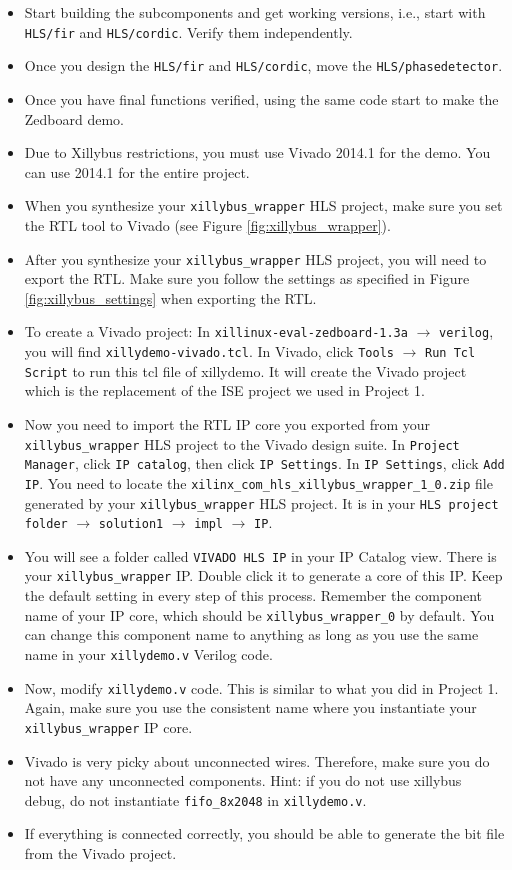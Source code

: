 \begin{itemize}
\item Start building the subcomponents and get working versions, i.e., start with \texttt{HLS/fir} and \texttt{HLS/cordic}. Verify them independently.
\item Once you design the \texttt{HLS/fir} and \texttt{HLS/cordic}, move the \texttt{HLS/phasedetector}. 
\item Once you have final functions verified, using the same code start to make the Zedboard demo.
\item Due to Xillybus restrictions, you must use Vivado 2014.1 for the demo. You can use 2014.1 for the entire project.
\item When you synthesize your \texttt{xillybus\_wrapper} HLS project, make sure you set the RTL tool to Vivado (see Figure \ref{fig:xillybus_wrapper}).
\item After you synthesize your \texttt{xillybus\_wrapper} HLS project, you will need to export the RTL. Make sure you follow the settings as specified in Figure \ref{fig:xillybus_settings} when exporting the RTL.
\item To create a Vivado project: In \texttt{xillinux-eval-zedboard-1.3a} $\rightarrow$ \texttt{verilog}, you will find \texttt{xillydemo-vivado.tcl}. In Vivado, click \texttt{Tools} $\rightarrow$ \texttt{Run Tcl Script} to run this tcl file of xillydemo. It will create the Vivado project which is the replacement of the ISE project we used in Project 1.
\item Now you need to import the RTL IP core you exported from your \texttt{xillybus\_wrapper} HLS project to the Vivado design suite.  In \texttt{Project Manager}, click \texttt{IP catalog}, then click \texttt{IP Settings}. In \texttt{IP Settings}, click \texttt{Add IP}. You need to locate the \texttt{xilinx\_com\_hls\_xillybus\_wrapper\_1\_0.zip} file generated by your \texttt{xillybus\_wrapper} HLS project. It is in your \texttt{HLS project folder} $\rightarrow$ \texttt{solution1} $\rightarrow$ \texttt{impl} $\rightarrow$ \texttt{IP}.
\item You will see a folder called \texttt{VIVADO HLS IP} in your IP Catalog view. There is your \texttt{xillybus\_wrapper} IP. Double click it to generate a core of this IP. Keep the default setting in every step of this process. Remember the component name of your IP core, which should be \texttt{xillybus\_wrapper\_0} by default. You can change this component name to anything as long as you use the same name in your \texttt{xillydemo.v} Verilog code.
\item Now, modify \texttt{xillydemo.v} code. This is similar to what you did in Project 1. Again, make sure you use the consistent name where you instantiate your \texttt{xillybus\_wrapper} IP core. 
\item Vivado is very picky about unconnected wires. Therefore, make sure you do not have any unconnected components. Hint: if you do not use xillybus debug, do not instantiate \texttt{fifo\_8x2048} in \texttt{xillydemo.v}.
\item If everything is connected correctly, you should be able to generate the bit file from the Vivado project. 
\end{itemize}

